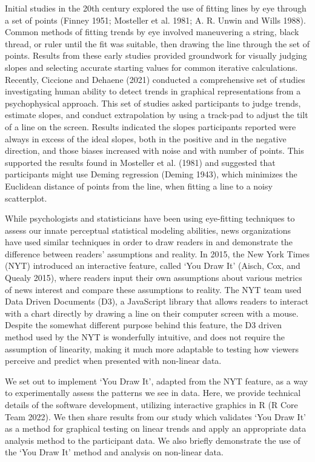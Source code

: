 \documentclass[
]{jds}
\begin{document}
Initial studies in the 20th century explored the use of fitting lines by
eye through a set of points (Finney 1951; Mosteller et al. 1981; A. R.
Unwin and Wills 1988). Common methods of fitting trends by eye involved
maneuvering a string, black thread, or ruler until the fit was suitable,
then drawing the line through the set of points. Results from these
early studies provided groundwork for visually judging slopes and
selecting accurate starting values for common iterative calculations.
Recently, Ciccione and Dehaene (2021) conducted a comprehensive set of
studies investigating human ability to detect trends in graphical
representations from a psychophysical approach. This set of studies
asked participants to judge trends, estimate slopes, and conduct
extrapolation by using a track-pad to adjust the tilt of a line on the
screen. Results indicated the slopes participants reported were always
in excess of the ideal slopes, both in the positive and in the negative
direction, and those biases increased with noise and with number of
points. This supported the results found in Mosteller et al. (1981) and
suggested that participants might use Deming regression (Deming 1943),
which minimizes the Euclidean distance of points from the line, when
fitting a line to a noisy scatterplot.

While psychologists and statisticians have been using eye-fitting
techniques to assess our innate perceptual statistical modeling
abilities, news organizations have used similar techniques in order to
draw readers in and demonstrate the difference between readers'
assumptions and reality. In 2015, the New York Times (NYT) introduced an
interactive feature, called `You Draw It' (Aisch, Cox, and Quealy 2015),
where readers input their own assumptions about various metrics of news
interest and compare these assumptions to reality. The NYT team used
Data Driven Documents (D3), a JavaScript library that allows readers to
interact with a chart directly by drawing a line on their computer
screen with a mouse. Despite the somewhat different purpose behind this
feature, the D3 driven method used by the NYT is wonderfully intuitive,
and does not require the assumption of linearity, making it much more
adaptable to testing how viewers perceive and predict when presented
with non-linear data.

We set out to implement `You Draw It', adapted from the NYT feature, as
a way to experimentally assess the patterns we see in data. Here, we
provide technical details of the software development, utilizing
interactive graphics in R (R Core Team 2022). We then share results from
our study which validates `You Draw It' as a method for graphical
testing on linear trends and apply an appropriate data analysis method
to the participant data. We also briefly demonstrate the use of the `You
Draw It' method and analysis on non-linear data.
\end{document}

